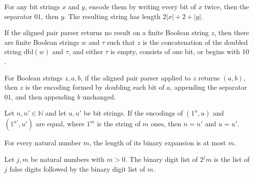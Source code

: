 \begin{theorem}
\label{Turing.length_pairEncode}
\leanok
{}
For any bit strings $x$ and $y$, encode them by writing every bit of $x$ twice, then the
separator $01$, then $y$. The resulting string has length $2|x|+2+|y|$.
\end{theorem}

\begin{theorem}
\label{Turing.pairDecode_eq_none}
\leanok
{}
If the aligned pair parser returns no result on a finite Boolean string $z$, then there
are finite Boolean strings $w$ and $\tau$ such that $z$ is the concatenation of the
doubled string $\mathrm{dbl}(w)$ and $\tau$, and either $\tau$ is empty, consists of one
bit, or begins with $10$.
\end{theorem}

\begin{theorem}
\label{Turing.eq_pairEncode_of_pairDecode}
\leanok
{}
For Boolean strings $z,a,b$, if the aligned pair parser applied to $z$ returns $(a,b)$,
then $z$ is the encoding formed by doubling each bit of $a$, appending the separator
$01$, and then appending $b$ unchanged.
\end{theorem}

\begin{lemma}
\label{Turing.pairEncode_replicate_inj}
\leanok
{}
Let $n,n'\in\mathbb{N}$ and let $u,u'$ be bit strings. If the encodings of $(1^n,u)$ and
$(1^{n'},u')$ are equal, where $1^m$ is the string of $m$ ones, then $n=n'$ and $u=u'$.
\end{lemma}

\begin{lemma}
\label{Turing.length_bits_le_self}
\leanok
{}
For every natural number $m$, the length of its binary expansion is at most $m$.
\end{lemma}

\begin{theorem}
\label{Turing.bits_two_pow_mul}
\leanok
{}
Let $j,m$ be natural numbers with $m>0$. The binary digit list of $2^j m$ is the list of
$j$ false digits followed by the binary digit list of $m$.
\end{theorem}

